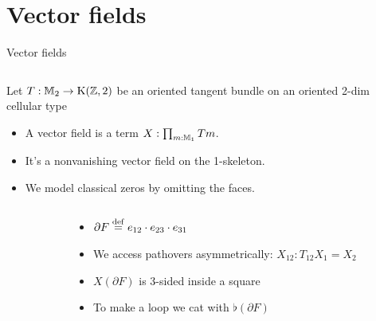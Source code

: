 \documentclass[14pt,aspectratio=169]{beamer}
\begin{document}
\section{Vector fields}
\begin{frame}{Vector fields}
\begin{columns}
\begin{column}{0.7\textwidth}
Let \( T:\mathbb{M}_2\to\mathrm{K}(\mathbb{Z},2) \) be an oriented tangent bundle on an oriented 2-dim cellular type
\begin{itemize}
\item A \alert{vector field} is a term \( X:\prod_{m:\mathbb{M}_1}Tm \).
\item It's a \alert{nonvanishing} vector field on the 1-skeleton.
\item We model classical zeros by omitting the faces.
\end{itemize}
\end{column}
\begin{column}{0.3\textwidth}

\end{column}
\end{columns}
\end{frame}

\begin{frame}
\begin{columns}
\begin{column}{0.6\textwidth}
\vspace{12pt}
\begingroup
{}

\endgroup
\end{column}
\begin{column}{0.4\textwidth}
\begin{itemize}
\item \( \partial F\stackrel{\mathrm{def}}{=} e_{12}\cdot e_{23}\cdot e_{31}  \)
\item We access pathovers asymmetrically: \( X_{12}:T_{12}X_1=X_2 \)
\item \( X(\partial F) \) is 3-sided inside a square
\item To make a loop we cat with \( \flat(\partial F) \)
\end{itemize}
\end{column}
\end{columns}
\end{frame}
\end{document}
